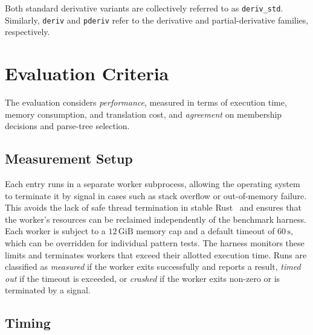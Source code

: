 Both standard derivative variants are collectively
referred to as \texttt{deriv\_std}.
Similarly, \texttt{deriv} and \texttt{pderiv}
refer to the derivative and partial-derivative
families, respectively.

%
%
%

\section{Evaluation Criteria}
\label{sec:eval-criteria}

The evaluation considers \emph{performance}, 
measured in terms of execution time, memory consumption, and translation cost, 
and \emph{agreement} on membership decisions and parse-tree selection.

%
%
%

\subsection{Measurement Setup}
\label{sec:eval-criteria-setup}

Each entry runs in a separate worker subprocess,
allowing the operating system to terminate it by signal
in cases such as stack overflow or out-of-memory failure.
This avoids the lack of safe thread termination in stable
Rust~\citep{rust-thread-joinhandle} and ensures that
the worker's resources can be reclaimed independently
of the benchmark harness.
Each worker is subject to a $12\,\mathrm{GiB}$ memory cap
and a default timeout of $60\,\mathrm{s}$,
which can be overridden for individual pattern tests.
The harness monitors these limits and terminates workers
that exceed their allotted execution time.
Runs are classified as \emph{measured} if the worker
exits successfully and reports a result,
\emph{timed out} if the timeout is exceeded,
or \emph{crashed} if the worker exits non-zero
or is terminated by a signal.

%
%
%

\subsection{Timing}
\label{sec:eval-criteria-timing}

